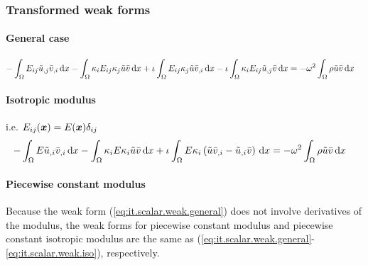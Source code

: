 \subsubsection{Transformed weak forms} \label{it.scalar.weak}

\paragraph{General case}
%
\begin{align}
    - \int_{\Omega} {
        E_{ij} \tilde{u}_{,j} \bar{v}_{,i} \,\mathrm{d}x
    } - \int_{\Omega} {
        \kappa_{i} E_{ij} \kappa_{j} \tilde{u} \bar{v} \,\mathrm{d}x
    } + \iota \int_{\Omega} {
        E_{ij} \kappa_{j} \tilde{u} \bar{v}_{,i} \,\mathrm{d}x
    } - \iota \int_{\Omega} {
        \kappa_{i} E_{ij} \tilde{u}_{,j} \bar{v} \,\mathrm{d}x
    } &=
    -\omega^2 \int_{\Omega} { \rho \tilde{u} \bar{v} \,\mathrm{d}x }
    \label{eq:it.scalar.weak.general}
\end{align}

\paragraph{Isotropic modulus} i.e. \(E_{ij}(\boldsymbol{x}) = E(\boldsymbol{x}) \delta_{ij}\)
%
\begin{align}
    - \int_{\Omega} {
        E \tilde{u}_{,i} \bar{v}_{,i} \,\mathrm{d}x
    } - \int_{\Omega} {
        \kappa_{i} E \kappa_{i} \tilde{u} \bar{v} \,\mathrm{d}x
    } + \iota \int_{\Omega} {
        E \kappa_{i} \left(
            \tilde{u} \bar{v}_{,i} - \tilde{u}_{,i} \bar{v}
        \right) \,\mathrm{d}x
    } &=
    -\omega^2 \int_{\Omega} { \rho \tilde{u} \bar{v} \,\mathrm{d}x }
    \label{eq:it.scalar.weak.iso}
\end{align}

\paragraph{Piecewise constant modulus} Because the weak form (\ref{eq:it.scalar.weak.general}) does not involve derivatives of the modulus, the weak forms for piecewise constant modulus and piecewise constant isotropic modulus are the same as (\ref{eq:it.scalar.weak.general}-\ref{eq:it.scalar.weak.iso}), respectively.
